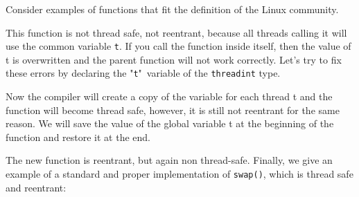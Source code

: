 {\begin{table}[H]
\begin{center}
		\end{center}
	\end{table}
	\par Consider examples of functions that fit the definition of the Linux community.
	\begin{figure}[H]
		
	\end{figure}
	\par This function is not thread safe, not reentrant, because all threads calling it will use the common variable \texttt{t}. If you call the function inside itself, then the value of t is overwritten and the parent function will not work correctly. Let's try to fix these errors by declaring the "\texttt{t}"\ variable of the \texttt{\textunderscore \textunderscore threadint} type.
	\begin{figure}[H]
		
	\end{figure}
	\par Now the compiler will create a copy of the variable for each thread t and the function will become thread safe, however, it is still not reentrant for the same reason. We will save the value of the global variable t at the beginning of the function and restore it at the end.
	\begin{figure}[H]
		
	\end{figure}
	\par The new function is reentrant, but again non thread-safe. Finally, we give an example of a standard and proper implementation of \texttt{swap()}, which is thread safe and reentrant:
	\begin{figure}[H]
		
	\end{figure}
}